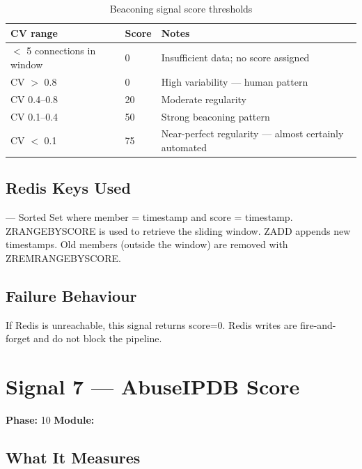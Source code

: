 \begin{fullwidth}
\begin{table}[h]
\caption{Beaconing signal score thresholds}
\label{tab:beacon-scores}
\begin{tabular}{@{}llp{6cm}@{}}
\toprule
\textbf{CV range} & \textbf{Score} & \textbf{Notes} \\
\midrule
$<$ 5 connections in window & 0 & Insufficient data; no score assigned \\
CV $>$ 0.8 & 0 & High variability — human pattern \\
CV 0.4–0.8 & 20 & Moderate regularity \\
CV 0.1–0.4 & 50 & Strong beaconing pattern \\
CV $<$ 0.1 & 75 & Near-perfect regularity — almost certainly automated \\
\bottomrule
\end{tabular}
\end{table}
\end{fullwidth}

\subsection{Redis Keys Used}

 — Sorted Set where member = timestamp and score = timestamp.
ZRANGEBYSCORE is used to retrieve the sliding window. ZADD appends new timestamps.
Old members (outside the window) are removed with ZREMRANGEBYSCORE.

\subsection{Failure Behaviour}

If Redis is unreachable, this signal returns score=0. Redis writes are fire-and-forget
and do not block the pipeline.

\section{Signal 7 — AbuseIPDB Score}
\label{sig:abuseipdb}

\textbf{Phase:} 10 \quad \textbf{Module:} 

\subsection{What It Measures}

